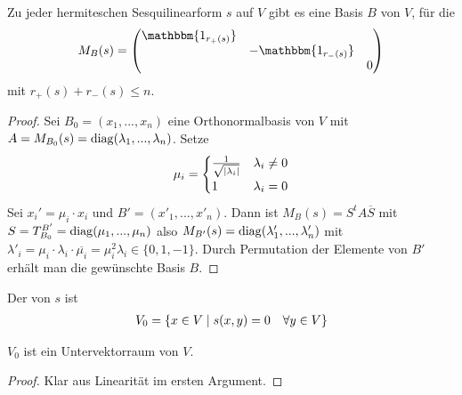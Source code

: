 \begin{conclusion}
	Zu jeder hermiteschen Sesquilinearform $s$ auf $V$ gibt es eine Basis $B$ von $V$, für die 
	\begin{align}
		M_B(s)=\begin{pmatrix}\mathbbm{1_{r_{+}(s)}}&\;&\;\\\;&-\mathbbm{1_{r_{-}(s)}}&\;\\\;&\;&0\end{pmatrix}\notag
	\end{align}
	mit $r_+(s)+r_-(s)\le n$.
\end{conclusion}
\begin{proof}
	Sei $B_0=(x_1,...,x_n)$ eine Orthonormalbasis von $V$ mit $A=M_{B_0}(s)=\operatorname{diag}(\lambda_1,...,\lambda_n)$. Setze 
	\begin{align}
		\mu_i=
		\begin{cases}
			\frac{1}{\sqrt{\vert\lambda_i\vert}} & \lambda_i\neq 0 \\
			1 & \lambda_i=0
		\end{cases}\notag
	\end{align}
	Sei $x_i'=\mu_i\cdot x_i$ und $B'=(x'_1,...,x'_n)$. Dann ist $M_B(s)=S^tA\overline{S}$ mit $S=T^{B'}_{B_0}=\operatorname{diag}(\mu_1,...,\mu_n)$ also $M_{B'}(s)=\operatorname{diag}(\lambda'_1,...,\lambda'_n)$ mit $\lambda'_i=\mu_i\cdot \lambda_i\cdot\overline{\mu_i}=\mu_i^2\lambda_i\in\{0,1,-1\}$. Durch Permutation der Elemente von $B'$ erhält man die gewünschte Basis $B$.
\end{proof}

\begin{definition}[Ausartungsraum]
	Der  von $s$ ist
	\begin{align}
		V_0=\{x\in V\mid s(x,y)=0\quad\forall y\in V\}\notag
	\end{align}
\end{definition}

\begin{lemma}
	$V_0$ ist ein Untervektorraum von $V$.
\end{lemma}
\begin{proof}
	Klar aus Linearität im ersten Argument.
\end{proof}

